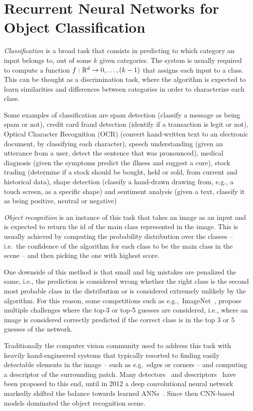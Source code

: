 \chapter{Recurrent Neural Networks for Object Classification}\label{sec:renet}

\emph{Classification} is a broad task that consists in predicting to which
category an input belongs to, out of some $k$ given categories. The system is
usually required to compute a function $f: \mathbb{R}^d \to {0, \dots, (k-1)}$ that
assigns each input to a class. This can be thought as a discrimination task,
where the algorithm is expected to learn similarities and differences between
categories in order to characterize each class.

Some examples of classification are spam detection (classify a message as being
spam or not), credit card fraud detection (identify if a transaction is legit
or not), Optical Character Recognition (OCR) (convert hand-written text to an
electronic document, by classifying each character), speech understanding
(given an utterance from a user, detect the sentence that was pronounced),
medical diagnosis (given the symptoms predict the illness and suggest a cure),
stock trading (determine if a stock should be bought, held or sold, from
current and historical data), shape detection (classify a hand-drawn drawing
from, e.g., a touch screen, as a specific shape) and sentiment analysis (given
a text, classify it as being positive, neutral or negative)

\emph{Object recognition} is an instance of this task that takes an image as an
input and is expected to return the id of the main class represented in the
image. This is usually achieved by computing the probability distribution over
the classes -- i.e.\ the confidence of the algorithm for each class to be the
main class in the scene -- and then picking the one with highest score.

One downside of this method is that small and big mistakes are penalized the
same, i.e., the prediction is considered wrong whether the right class is the
second most probable class in the distribution or is considered extremely
unlikely by the algorithm. For this reason, some competitions such as
e.g.,~ImageNet~\citep{imagenet_cvpr09, ILSVRCarxiv14}, propose multiple
challenges where the top-3 or top-5 guesses are considered, i.e., where an
image is considered correctly predicted if the correct class is in the top
$3$ or $5$ guesses of the network.

Traditionally the computer vision community used to address this task with
heavily hand-engineered systems that typically resorted to finding easily
detectable elements in the image -- such as e.g.\ edges or corners -- and
computing a descriptor of the surrounding patch. Many detectors~\citep{
dufournaud2000matching,harris1988combined,mikolajczyk2001indexing,
lowe2004distinctive,mikolajczyk2005performance} and descriptors~\citep{
lowe1999object,mikolajczyk2005performance,belongie2002shape} have been proposed
to this end, until in 2012 a deep convolutional neural network markedly shifted
the balance towards learned ANNs~\citep{Krizhevsky-2012}. Since then CNN-based
models dominated the object recognition scene.

